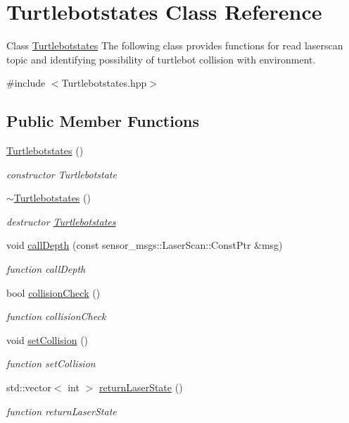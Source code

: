 \hypertarget{classTurtlebotstates}{}\section{Turtlebotstates Class Reference}
\label{classTurtlebotstates}


Class \hyperlink{classTurtlebotstates}{Turtlebotstates} The following class provides functions for read laserscan topic and identifying possibility of turtlebot collision with environment.  




{\ttfamily \#include $<$Turtlebotstates.\+hpp$>$}

\subsection*{Public Member Functions}
\begin{DoxyCompactItemize}
\item 
\hyperlink{classTurtlebotstates_a4dca61868c5ae3ea477e3305700d9ad9}{Turtlebotstates} ()
\begin{DoxyCompactList}\small\item\em constructor Turtlebotstate \end{DoxyCompactList}\item 
\hyperlink{classTurtlebotstates_a30f6ce845491e7c8da05287d18e680b9}{$\sim$\+Turtlebotstates} ()
\begin{DoxyCompactList}\small\item\em destructor \hyperlink{classTurtlebotstates}{Turtlebotstates} \end{DoxyCompactList}\item 
void \hyperlink{classTurtlebotstates_a38af7c7caf90b3775fb12d8457320758}{call\+Depth} (const sensor\+\_\+msgs\+::\+Laser\+Scan\+::\+Const\+Ptr \&msg)
\begin{DoxyCompactList}\small\item\em function call\+Depth \end{DoxyCompactList}\item 
bool \hyperlink{classTurtlebotstates_a1413e295064f4cea1a93e6f2a7f32fb6}{collision\+Check} ()
\begin{DoxyCompactList}\small\item\em function collision\+Check \end{DoxyCompactList}\item 
void \hyperlink{classTurtlebotstates_ac9318249e69e0aa6cb1a4fee4ad8e5f9}{set\+Collision} ()
\begin{DoxyCompactList}\small\item\em function set\+Collision \end{DoxyCompactList}\item 
std\+::vector$<$ int $>$ \hyperlink{classTurtlebotstates_ab183a7c1858883449cf47996e0dd1ecd}{return\+Laser\+State} ()
\begin{DoxyCompactList}\small\item\em function return\+Laser\+State \end{DoxyCompactList}\end{DoxyCompactItemize}


